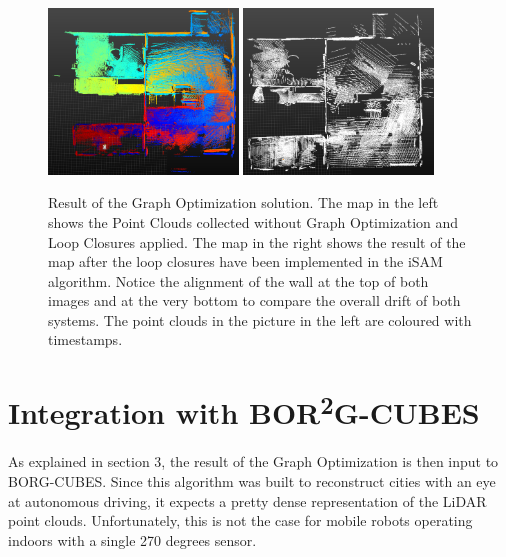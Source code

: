 \documentclass[12pt]{article}
\begin{document}
	\begin{figure}[ht]
		\includegraphics[width=0.45\textwidth]{ResultNoLoopClosure}
		\includegraphics[width=0.45\textwidth]{ResultLoopClosure}
		\caption{Result of the Graph Optimization solution. The map in the left shows the Point Clouds collected without Graph Optimization and Loop Closures applied. The map in the right shows the result of the map after the loop closures have been implemented in the iSAM algorithm. Notice the alignment of the wall at the top of both images and at the very bottom to compare the overall drift of both systems. The point clouds in the picture in the left are coloured with timestamps.}
		\label{fig:GraphOptimization1}	
	\end{figure}
	\newpage
	\section{Integration with BOR\textsuperscript{2}G-CUBES}
	\paragraph{}
	As explained in section 3, the result of the Graph Optimization is then input to BORG-CUBES. Since this algorithm was built to reconstruct cities with an eye at autonomous driving, it expects a pretty dense representation of the LiDAR point clouds. Unfortunately, this is not the case for mobile robots operating indoors with a single 270 degrees sensor.
	
\end{document}
